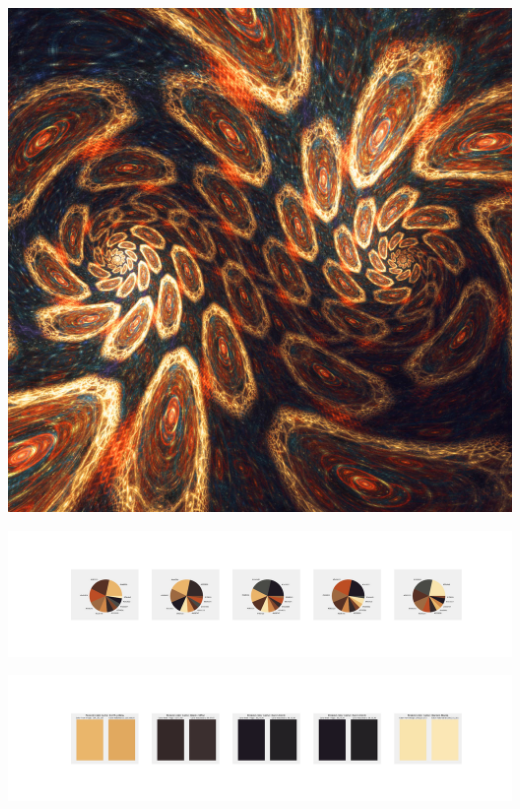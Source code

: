 \documentclass[11pt]{article}
\begin{document}
\begin{landscape}
    \begin{center}
    \includegraphics[width=\textwidth]{./nbimg/file (191).jpg}
    \end{center}

    \begin{center}
    \includegraphics[width=250mm]{./nbimg/pie-102.jpg}
    \end{center}

    \begin{center}
    \includegraphics[width=250mm]{./nbimg/peak-102.jpg}
    \end{center}
    


\end{landscape}
\end{document}
